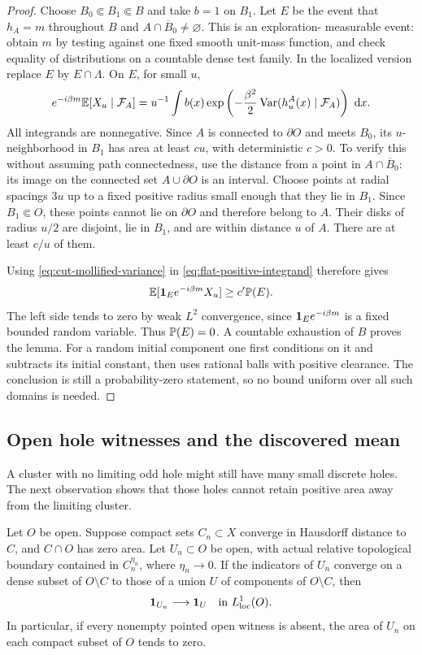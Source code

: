 \begin{proof}
Choose $B_0\Subset B_1\Subset B$ and take $b=1$ on $B_1$.
Let $E$ be the event that $h_A=m$ throughout $B$ and
$A\cap\overline B_0\ne\varnothing$. This is an exploration-
measurable event: obtain $m$ by testing against one fixed smooth
unit-mass function, and check equality of distributions on a
countable dense test family. In the localized version replace $E$
by $E\cap\Lambda$. On $E$, for small $u$,
\begin{equation}
 e^{-i\beta m}\E[X_u\mid\cF_A]
   =u^{-1}\int b(x)
      \exp\left(-\frac{\beta^2}{2}
          \Var(h_u^A(x)\mid\cF_A)\right)\,\dd x.
 \label{eq:flat-positive-integrand}
\end{equation}
All integrands are nonnegative. Since $A$ is connected to
$\partial O$ and meets $B_0$, its $u$-neighborhood in $B_1$ has
area at least $cu$, with deterministic $c>0$. To verify this
without assuming path connectedness, use the distance from a
point in $A\cap\overline B_0$: its image on the connected set
$A\cup\partial O$ is an interval. Choose points at radial spacings
$3u$ up to a fixed positive radius small enough that they lie in $B_1$.
Since $B_1\Subset O$, these points cannot lie on $\partial O$ and
therefore belong to $A$. Their disks of radius $u/2$ are
disjoint, lie in $B_1$, and are within distance $u$ of $A$.
There are at least $c/u$ of them.

Using \eqref{eq:cut-mollified-variance} in
\eqref{eq:flat-positive-integrand} therefore gives
\[
 \E[\ind_E e^{-i\beta m}X_u]\geq c'\P(E).
\]
The left side tends to zero by weak $L^2$ convergence, since
$\ind_Ee^{-i\beta m}$ is a fixed bounded random variable.
Thus $\P(E)=0$. A countable exhaustion of $B$ proves the lemma.
For a random initial component one first conditions on it and
subtracts its initial constant, then uses rational balls with
positive clearance. The conclusion is still a probability-zero
statement, so no bound uniform over all such domains is needed.
\end{proof}

\subsection{Open hole witnesses and the discovered mean}

A cluster with no limiting odd hole might still have many small discrete
holes. The next observation shows that those holes cannot retain positive
area away from the limiting cluster.

\begin{lemma}
\label{lem:hole-witnesses}
Let \(O\) be open. Suppose compact sets \(C_n\subset X\) converge in
Hausdorff distance to \(C\), and \(C\cap O\) has zero area. Let
\(U_n\subset O\) be open, with actual relative topological boundary
contained in \(C_n^{\eta_n}\), where \(\eta_n\to0\).
If the indicators of \(U_n\) converge on a dense subset of
\(O\setminus C\) to those of a union \(U\) of components of
\(O\setminus C\), then
\[
 \ind_{U_n}\longrightarrow\ind_U\quad\text{in }L^1_{\rm loc}(O).
\]
In particular, if every nonempty pointed open witness is absent,
the area of \(U_n\) on each compact subset of \(O\) tends to zero.
\end{lemma}

